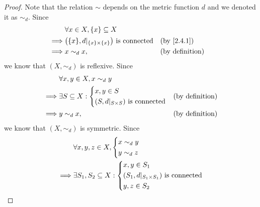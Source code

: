 \begin{proof}
  Note that the relation \(\sim\) depends on the metric function \(d\) and we denoted it as \(\sim_d\).
  Since
  \begin{align*}
             & \forall x \in X, \set{x} \subseteq X                                                            \\
    \implies & \big(\set{x}, d|_{\set{x} \times \set{x}}\big) \text{ is connected} &  & \by{2.4.1}             \\
    \implies & x \sim_d x,                                                         &  & \text{(by definition)}
  \end{align*}
  we know that \((X, \sim_d)\) is reflexive.
  Since
  \begin{align*}
             & \forall x, y \in X, x \sim_d y                                        \\
    \implies & \exists S \subseteq X : \begin{dcases}
                                         x, y \in S \\
                                         (S, d|_{S \times S}) \text{ is connected}
                                       \end{dcases} &  & \text{(by definition)}      \\
    \implies & y \sim_d x,                               &  & \text{(by definition)}
  \end{align*}
  we know that \((X, \sim_d)\) is symmetric.
  Since
  \begin{align*}
             & \forall x, y, z \in X, \begin{dcases}
                                        x \sim_d y \\
                                        y \sim_d z
                                      \end{dcases}                                                                                                     \\
    \implies & \exists S_1, S_2 \subseteq X : \begin{dcases}
                                                x, y \in S_1                                    \\
                                                (S_1, d|_{S_1 \times S_1}) \text{ is connected} \\
                                                y, z \in S_2                                    \\

\end{dcases}
\end{align*}
\end{proof}
